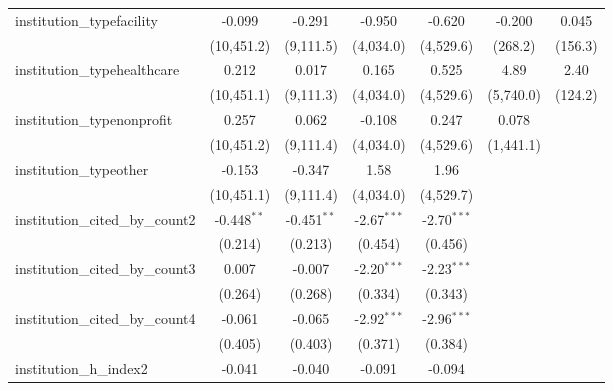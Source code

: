 \begin{tabular}{lcccccc}
   institution\_typefacility             & -0.099         & -0.291         & -0.950        & -0.620        & -0.200        & 0.045\\   
                                         & (10,451.2)     & (9,111.5)      & (4,034.0)     & (4,529.6)     & (268.2)       & (156.3)\\   
   institution\_typehealthcare           & 0.212          & 0.017          & 0.165         & 0.525         & 4.89          & 2.40\\   
                                         & (10,451.1)     & (9,111.3)      & (4,034.0)     & (4,529.6)     & (5,740.0)     & (124.2)\\   
   institution\_typenonprofit            & 0.257          & 0.062          & -0.108        & 0.247         & 0.078         &   \\   
                                         & (10,451.2)     & (9,111.4)      & (4,034.0)     & (4,529.6)     & (1,441.1)     &   \\   
   institution\_typeother                & -0.153         & -0.347         & 1.58          & 1.96          &               &   \\   
                                         & (10,451.1)     & (9,111.4)      & (4,034.0)     & (4,529.7)     &               &   \\   
   institution\_cited\_by\_count2        & -0.448$^{**}$  & -0.451$^{**}$  & -2.67$^{***}$ & -2.70$^{***}$ &               &   \\   
                                         & (0.214)        & (0.213)        & (0.454)       & (0.456)       &               &   \\   
   institution\_cited\_by\_count3        & 0.007          & -0.007         & -2.20$^{***}$ & -2.23$^{***}$ &               &   \\   
                                         & (0.264)        & (0.268)        & (0.334)       & (0.343)       &               &   \\   
   institution\_cited\_by\_count4        & -0.061         & -0.065         & -2.92$^{***}$ & -2.96$^{***}$ &               &   \\   
                                         & (0.405)        & (0.403)        & (0.371)       & (0.384)       &               &   \\   
   institution\_h\_index2                & -0.041         & -0.040         & -0.091        & -0.094        &               &   \\   

\end{tabular}
